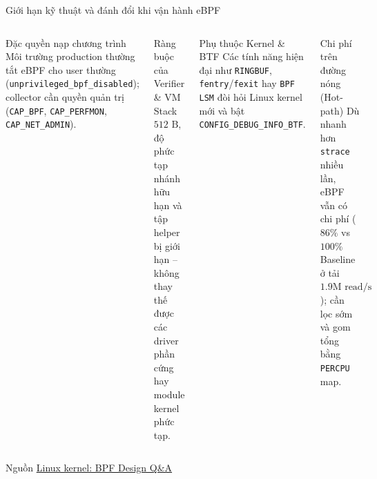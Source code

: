 \begin{frame}{Giới hạn kỹ thuật và đánh đổi khi vận hành eBPF}
  \begin{columns}[T,onlytextwidth]
    \begin{block}{Đặc quyền nạp chương trình}
      \small
      Môi trường production thường tắt eBPF cho user thường (\texttt{unprivileged\_bpf\_disabled}); collector cần quyền quản trị (\texttt{CAP\_BPF}, \texttt{CAP\_PERFMON}, \texttt{CAP\_NET\_ADMIN}).
    \end{block}
    \begin{block}{Ràng buộc của Verifier \& VM}
      \small
      Stack $512\text{ B}$, độ phức tạp nhánh hữu hạn và tập helper bị giới hạn -- không thay thế được các driver phần cứng hay module kernel phức tạp.
    \end{block}

    \begin{block}{Phụ thuộc Kernel \& BTF}
      \small
      Các tính năng hiện đại như \texttt{RINGBUF}, \texttt{fentry}/\texttt{fexit} hay \texttt{BPF LSM} đòi hỏi Linux kernel mới và bật \texttt{CONFIG\_DEBUG\_INFO\_BTF}.
    \end{block}
    \begin{block}{Chi phí trên đường nóng (Hot-path)}
      \small
      Dù nhanh hơn \texttt{strace} nhiều lần, eBPF vẫn có chi phí ($86\%$ vs $100\%$ Baseline ở tải $1.9\text{M read/s}$); cần lọc sớm và gom tổng bằng \texttt{PERCPU} map.
    \end{block}
  \end{columns}
  \medskip
  {\scriptsize Nguồn \href{https://docs.kernel.org/bpf/bpf_design_QA.html}{Linux kernel: BPF Design Q\&A}}
\end{frame}

